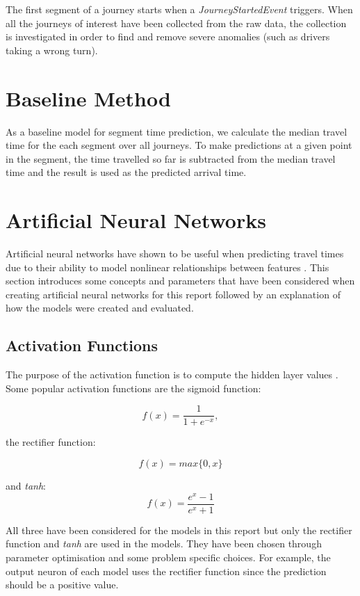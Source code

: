 The first segment of a journey starts when a \textit{JourneyStartedEvent} triggers. When all the journeys of interest have been collected from the raw data, the collection is investigated in order to find and remove severe anomalies (such as drivers taking a wrong turn). 

\section{Baseline Method}
As a baseline model for segment time prediction, we calculate the median travel time for the each segment over all journeys. To make predictions at a given point in the segment, the time travelled so far is subtracted from the median travel time and the result is used as the predicted arrival time.

\section{Artificial Neural Networks}

Artificial neural networks have shown to be useful when predicting travel times due to their ability to model nonlinear relationships between features \cite{brazilANN, malaysiaANN}. This section introduces some concepts and parameters that have been considered when creating artificial neural networks for this report followed by an explanation of how the models were created and evaluated.

\subsection{Activation Functions}
The purpose of the activation function is to compute the hidden layer values \cite{Goodfellow-et-al-2016}. Some popular activation functions are the sigmoid function:

\begin{equation} 
    f(x) = \frac{1}{1+e^{-x}},
\end{equation}

the rectifier function:

\begin{equation} 
    f(x) = max\{0,x\}
\end{equation}

and \textit{tanh}:
\begin{equation} 
    f(x) =  \frac{e^x-1}{e^{x}+1} 
\end{equation}

All three have been considered for the models in this report but only the rectifier function and \textit{tanh} are used in the models. They have been chosen through parameter optimisation and some problem specific choices. For example, the output neuron of each model uses the rectifier function since the prediction should be a positive value.

